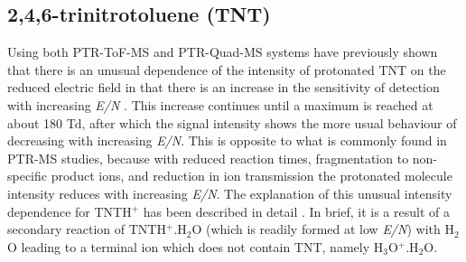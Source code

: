









\subsection{2,4,6-trinitrotoluene (TNT)}
Using both PTR-ToF-MS and PTR-Quad-MS systems \citeauthor{sulzer2012proton} have previously shown that there is an unusual dependence of the intensity of protonated TNT on the reduced electric field in that there is an increase in the sensitivity of detection with increasing \textit{E/N} \cite{sulzer2012proton,mayhew2010applications}. This increase continues until a maximum is reached at about 180 Td, after which the signal intensity shows the more usual behaviour of decreasing with increasing \textit{E/N}. This is opposite to what is commonly found in PTR-MS studies, because with reduced reaction times, fragmentation to non-specific product ions, and reduction in ion transmission the protonated molecule intensity reduces with increasing \textit{E/N}. The explanation of this unusual intensity dependence for TNTH$^+$ has been described in detail \cite{sulzer2012proton}. In brief, it is a result of a secondary reaction of TNTH$^+$.H$_2$O (which is readily formed at low \textit{E/N}) with H$_2$O leading to a terminal ion which does not contain TNT, namely H$_3$O$^+$.H$_2$O. 

